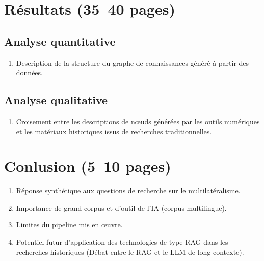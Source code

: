 \documentclass[12pt]{article}
\begin{document}
\section*{Résultats (35--40 pages)}

\subsection*{Analyse quantitative}

\begin{enumerate}[label=\alph*.]
    \item Description de la structure du graphe de connaissances généré à partir des données.
\end{enumerate}

\subsection*{Analyse qualitative}

\begin{enumerate}[label=\alph*.]
    \item Croisement entre les descriptions de nœuds générées par les outils numériques et les matériaux historiques issus de recherches traditionnelles.
\end{enumerate}

\section*{Conlusion (5--10 pages)}

\begin{enumerate}[label=\alph*.]
    \item Réponse synthétique aux questions de recherche sur le multilatéralisme.
    \item Importance de grand corpus et d'outil de l'IA (corpus multilingue).
    \item Limites du pipeline mis en œuvre.
    \item Potentiel futur d’application des technologies de type RAG dans les recherches historiques (Débat entre le RAG et le LLM de long contexte).
\end{enumerate}
\end{document}
